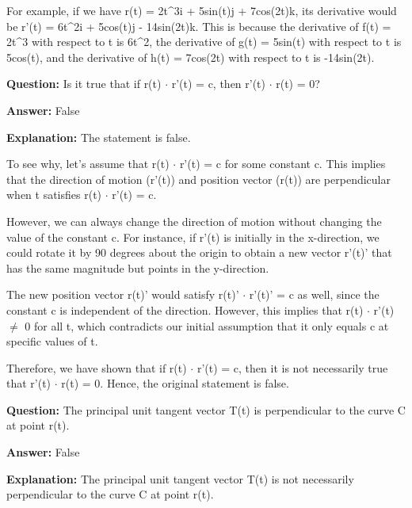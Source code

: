 \documentclass{article}
\begin{document}
For example, if we have r(t) = 2t{\textasciicircum}3i + 5sin(t)j + 7cos(2t)k, its derivative would be r'(t) = 6t{\textasciicircum}2i + 5cos(t)j - 14sin(2t)k. This is because the derivative of f(t) = 2t{\textasciicircum}3 with respect to t is 6t{\textasciicircum}2, the derivative of g(t) = 5sin(t) with respect to t is 5cos(t), and the derivative of h(t) = 7cos(2t) with respect to t is -14sin(2t).
                
                \vspace{0.5cm} 
        
            
                \textbf {Question:} Is it true that if r(t) \ensuremath{\cdot} r'(t) = c, then r'(t) \ensuremath{\cdot} r(t) = 0?
                
                \textbf{Answer:} False

                \textbf{Explanation:} The statement is false.

To see why, let's assume that r(t) \ensuremath{\cdot} r'(t) = c for some constant c. This implies that the direction of motion (r'(t)) and position vector (r(t)) are perpendicular when t satisfies r(t) \ensuremath{\cdot} r'(t) = c.

However, we can always change the direction of motion without changing the value of the constant c. For instance, if r'(t) is initially in the x-direction, we could rotate it by 90 degrees about the origin to obtain a new vector r'(t)' that has the same magnitude but points in the y-direction.

The new position vector r(t)' would satisfy r(t)' \ensuremath{\cdot} r'(t)' = c as well, since the constant c is independent of the direction. However, this implies that r(t) \ensuremath{\cdot} r'(t) \ensuremath{\neq} 0 for all t, which contradicts our initial assumption that it only equals c at specific values of t.

Therefore, we have shown that if r(t) \ensuremath{\cdot} r'(t) = c, then it is not necessarily true that r'(t) \ensuremath{\cdot} r(t) = 0. Hence, the original statement is false.
                
                \vspace{0.5cm} 
        
            
                \textbf {Question:} The principal unit tangent vector T(t) is perpendicular to the curve C at point r(t).
                
                \textbf{Answer:} False

                \textbf{Explanation:} The principal unit tangent vector T(t) is not necessarily perpendicular to the curve C at point r(t).
\end{document}
